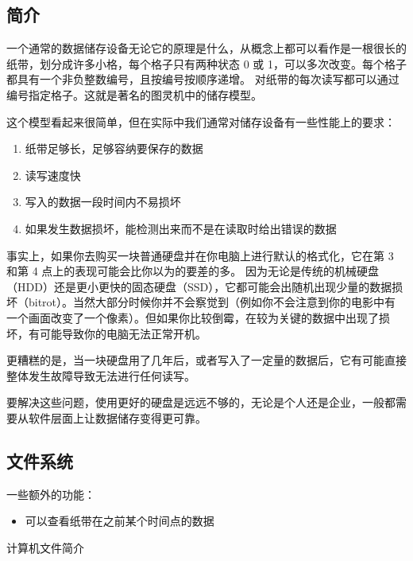 

\begin{issues}
\issueDraft
\end{issues}

\subsection{简介}
一个通常的数据储存设备无论它的原理是什么，从概念上都可以看作是一根很长的纸带，划分成许多小格，每个格子只有两种状态 0 或 1，可以多次改变。每个格子都具有一个非负整数编号，且按编号按顺序递增。 对纸带的每次读写都可以通过编号指定格子。这就是著名的图灵机中的储存模型。

这个模型看起来很简单，但在实际中我们通常对储存设备有一些性能上的要求：
\begin{enumerate}
\item 纸带足够长，足够容纳要保存的数据
\item 读写速度快
\item 写入的数据一段时间内不易损坏
\item 如果发生数据损坏，能检测出来而不是在读取时给出错误的数据
\end{enumerate}

事实上，如果你去购买一块普通硬盘并在你电脑上进行默认的格式化，它在第 3 和第 4 点上的表现可能会比你以为的要差的多。 因为无论是传统的机械硬盘（HDD）还是更小更快的固态硬盘（SSD），它都可能会出随机出现少量的数据损坏（bitrot）。当然大部分时候你并不会察觉到（例如你不会注意到你的电影中有一个画面改变了一个像素）。但如果你比较倒霉，在较为关键的数据中出现了损坏，有可能导致你的电脑无法正常开机。

更糟糕的是，当一块硬盘用了几年后，或者写入了一定量的数据后，它有可能直接整体发生故障导致无法进行任何读写。

要解决这些问题，使用更好的硬盘是远远不够的，无论是个人还是企业，一般都需要从软件层面上让数据储存变得更可靠。

\subsection{文件系统}
一些额外的功能：
\begin{itemize}
\item 可以查看纸带在之前某个时间点的数据
\end{itemize}

计算机文件简介

